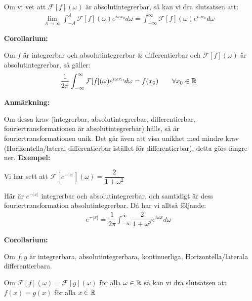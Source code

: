 \par\bigskip
\noindent Om vi vet att $\mathcal{F}[f](\omega)$ är absolutintegrerbar, så kan vi dra slutsatsen att:
\begin{equation*}
  \begin{gathered}
    \lim_{A\to\infty}\int_{-A}^{A}\mathcal{F}[f](\omega)e^{i\omega x_0} d\omega = \int_{-\infty}^{\infty}\mathcal{F}[f](\omega)e^{i\omega x_0}d\omega
  \end{gathered}
\end{equation*}
\par\bigskip
\noindent\textbf{Corollarium:}\par
\noindent Om $f$ är integrerbar och absolutintegrerbar \& differentierbar och $\mathcal{F}[f](\omega)$ är absolutintegrerbar, så gäller:
\begin{equation*}
  \begin{gathered}
    \dfrac{1}{2\pi}\int_{-\infty}^{\infty}\mathcal{F}[f](\omega)e^{i\omega x_0}d\omega = f(x_0)\qquad\forall x_0\in\mathbb{R}
  \end{gathered}
\end{equation*}
\par\bigskip
\noindent\textbf{Anmärkning:}\par
\noindent Om dessa krav (integrerbar, absolutintegrerbar, differentierbar, fouriertransformationen är absolutintegrerbar) hålls, så är fouriertransformationen unik. Det går även att visa unikhet med mindre krav (Horizontella/lateral differentierbar istället för differentierbar), detta görs längre ner.
\newpage
\noindent\textbf{Exempel:}\par
\noindent Vi har sett att $\mathcal{F}[e^{-\left|x\right|}](\omega) = \dfrac{2}{1+\omega^2}$\par
\noindent Här är $e^{-\left|x\right|}$ integrerbar och absolutintegrerbar, och samtidigt är dess fouriertransformation absolutintegrerbar. Då har vi alltså följande:
\begin{equation*}
  \begin{gathered}
    e^{-\left|x\right|} = \dfrac{1}{2\pi}\int_{-\infty}^{\infty}\dfrac{2}{1+\omega^2}e^{i\omega x}d\omega
  \end{gathered}
\end{equation*}
\par\bigskip
\noindent\textbf{Corollarium:}\par
\noindent Om $f,g$ är integrerbara, absolutintegrerbara, kontinuerliga, Horizontella/laterala differentierbara.\par
\noindent Om $\mathcal{F}[f](\omega) = \mathcal{F}[g](\omega)$ för alla $\omega\in\mathbb{R}$ så kan vi dra slutsatsen att $f(x) = g(x)$ för alla $x\in\mathbb{R}$

